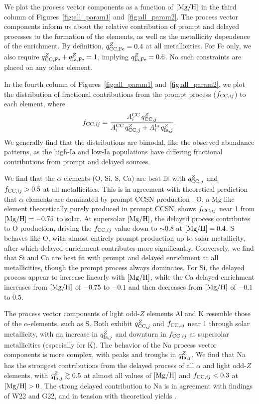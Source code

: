 \documentclass[modern]{aastex631}
\newcommand{\mgh}{[{\rm Mg}/{\rm H}]}
\newcommand{\qcc}{q_{{\rm CC,}j}^{Z}}
\newcommand{\qccFe}{q_{{\rm CC, Fe}}^{Z}}
\newcommand{\qIa}{q_{{\rm Ia,}j}^{Z}}
\newcommand{\qIaFe}{q_{{\rm Ia,Fe}}^{Z}}
\newcommand{\Acc}{A^{\rm CC}_{i}}
\newcommand{\AIa}{A^{\rm Ia}_{i}}
\newcommand{\fcc}{f_{{\rm CC}, ij}}
\begin{document}
We plot the process vector components as a function of $\mgh$ in the third column of Figures~\ref{fig:all_param1} and~\ref{fig:all_param2}. The process vector components inform us about the relative contribution of prompt and delayed processes to the formation of the elements, as well as the metallicity dependence of the enrichment. By definition, $\qccFe=0.4$ at all metallicities. For Fe only, we also require $\qccFe + \qIaFe = 1$, implying $\qIaFe=0.6$. No such constraints are placed on any other element. 

In the fourth column of Figures~\ref{fig:all_param1} and~\ref{fig:all_param2}, we plot the distribution of fractional contributions from the prompt process ($\fcc$) to each element, where
\begin{equation}\label{eq:fcc}
    \fcc = \frac{\Acc \, \qcc}{\Acc \, \qcc + \AIa \, \qIa}.
\end{equation}
We generally find that the distributions are bimodal, like the observed abundance patterns, as the high-Ia and low-Ia populations have differing fractional contributions from prompt and delayed sources.

We find that the $\alpha$-elements (O, Si, S, Ca) are best fit with $\qcc$ and $\fcc > 0.5$ at all metallicities. This is in agreement with theoretical prediction that $\alpha$-elements are dominated by prompt CCSN production \citep[e.g.][]{andrews2017}. O, a Mg-like element theoretically purely produced in prompt CCSN, shows $\fcc$ near 1 from $\mgh=-0.75$ to solar. At supersolar $\mgh$, the delayed process contributes to O production, driving the $\fcc$ value down to $\sim 0.8$ at $\mgh=0.4$. S behaves like O, with almost entirely prompt production up to solar metallicity, after which delayed enrichment contributes more significantly. Conversely, we find that Si and Ca are best fit with prompt and delayed enrichment at all metallicities, though the prompt process always dominates. For Si, the delayed process appear to increase linearly with $\mgh$, while the Ca delayed enrichment increases from $\mgh$ of $-0.75$ to $-0.1$ and then decreases from $\mgh$ of $-0.1$ to $0.5$.

The process vector components of light odd-$Z$ elements Al and K resemble those of the $\alpha$-elements, such as S. Both exhibit $\qcc$ and $\fcc$ near 1 through solar metallicity, with an increase in $\qIa$ and downturn in $\fcc$ at supersolar metallicities (especially for K). The behavior of the Na process vector components is more complex, with peaks and troughs in $\qIa$. We find that Na has the strongest contributions from the delayed process of all $\alpha$ and light odd-$Z$ elements, with $\qIa \gtrsim 0.5$ at almost all values of $\mgh$ and $\fcc < 0.3$ at $\mgh > 0$. The strong delayed contribution to Na is in agreement with findings of W22 and G22, and in tension with theoretical yields \citep[e.g.][]{andrews2017, rybizki2017}.
\end{document}
